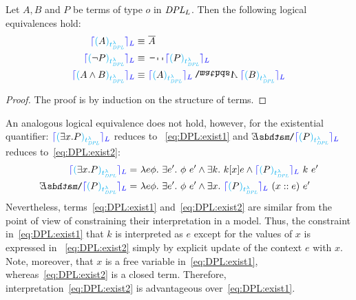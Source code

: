 \begin{theorem} Let $A, B$ and $P$ be terms of type $o$ in $\textit{DPL}_L$. Then the following logical equivalences hold:
\begin{align*}
\mdpllstodl{\mdplstodpll{A}} \logeq \ & \tr{A} \notag \\
\mdpllstodl{ \mdplstodpll {\neg P} } \logeq \ & \n2  \mdpllstodl{ \mdplstodpll {P} } \notag \\
\mdpllstodl{ \mdplstodpll { A \land B} } \logeq \ &  \mdpllstodl{ \mdplstodpll { A } }  \cnj2 \mdpllstodl{ \mdplstodpll {B} }
\end{align*}
\end{theorem}
\begin{proof}
The proof is by induction on the structure of terms.
\end{proof}

\noindent An analogous logical equivalence does not hold, however, for the existential quantifier: $\textcolor{blue}{\lceil}  \textcolor{cyan}{(}  \exists x. P \textcolor{cyan}{ )_{t^{\lambda}_\textit{DPL}}}  \textcolor{blue}{\rceil_L} $ reduces to ~\eqref{eq:DPL:exist1} and $\ex2 \mdpllstodl{ \mdplstodpll {P} } $ reduces to~\eqref{eq:DPL:exist2}:
\begin{align}
\mdpllstodl{ \mdplstodpll { \exists x. P} } = \ & \lambda e \phi. \ \exists e'.  \ \phi \ e' \land \exists k. \ k [x] e \land \mdpllstodl{ \mdplstodpll {P} } \  k \ e'  \label{eq:DPL:exist1} \\
\ex2 \mdpllstodl{ \mdplstodpll {P} } = \ & \lambda e \phi.  \ \exists e'.  \ \phi \ e' \land  \exists x. \ \mdpllstodl{ \mdplstodpll {P} } \ (x::e) \ e'  \label{eq:DPL:exist2} 
\end{align}
Nevertheless, terms~\eqref{eq:DPL:exist1} and~\eqref{eq:DPL:exist2} are similar from the point of view of constraining their interpretation in a model. Thus, the constraint in~\eqref{eq:DPL:exist1} that $k$ is interpreted as $e$ except for the values of $x$ is expressed in
~\eqref{eq:DPL:exist2} simply by explicit update of the context $e$ with $x$.
Note, moreover, that $x$ is a free variable in~\eqref{eq:DPL:exist1}, whereas~\eqref{eq:DPL:exist2} is a closed term. Therefore, interpretation~\eqref{eq:DPL:exist2} is advantageous over~\eqref{eq:DPL:exist1}.
 